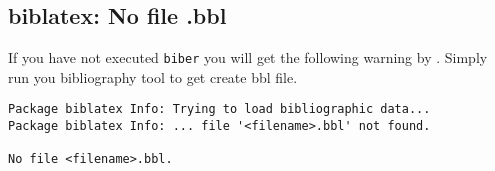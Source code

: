 %
%
%


\subsection{biblatex: No file \texorpdfstring{}{filename}.bbl}

If you have not executed \texttt{biber} you will get the following warning by
. Simply run you bibliography tool to get create bbl file.

\begin{verbatim}
Package biblatex Info: Trying to load bibliographic data...
Package biblatex Info: ... file '<filename>.bbl' not found.

No file <filename>.bbl.
\end{verbatim}

%

